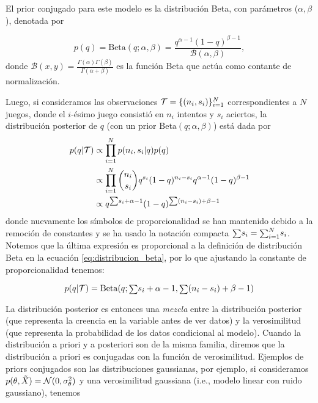 El prior conjugado para este modelo es la distribución Beta, con parámetros ($\alpha, \beta$), denotada por 

\begin{equation}
	p(q) = \text{Beta}(q;\alpha,\beta) = \frac{q^{\alpha-1}(1-q)^{\beta-1}}{\mathcal{B}(\alpha, \beta)},
	\label{eq:distribucion_beta}
\end{equation}
donde $\mathcal{B}(x,y) = \frac{\Gamma(\alpha)\Gamma(\beta)}{\Gamma(\alpha+\beta)}$ es la función Beta que actúa como contante de normalización.


Luego, si consideramos las observaciones ${\mathcal T} = \{(n_i,s_i)\}_{i=1}^N$ correspondientes a $N$ juegos, donde el $i$-ésimo juego consistió en $n_i$ intentos y $s_i$ aciertos, la distribución posterior de $q$ (con un prior $\text{Beta}(q;\alpha,\beta)$) está dada por
\begin{align}
	p(q|{\mathcal T}) & 	\propto \prod_{i=1}^N  p(n_i,s_i|q)p(q)  \\
			 & \propto  \prod_{i=1}^N\binom{n_i}{s_i}q^{s_i}(1-q)^{n_i-s_i}q^{\alpha-1}(1-q)^{\beta-1} \nonumber\\
			 & \propto  q^{{\scriptstyle\sum} s_i + \alpha - 1}(1-q)^{{\scriptstyle\sum} (n_i-s_i) + \beta-1} \nonumber
\end{align}
donde nuevamente los símbolos de proporcionalidad se han mantenido debido a la remoción de constantes y se ha usado la notación compacta ${\scriptstyle\sum} s_i = {\scriptstyle\sum}_{i=1}^N s_i$. Notemos que la última expresión es proporcional a la definición de distribución Beta en la ecuación \eqref{eq:distribucion_beta}, por lo que ajustando la constante de proporcionalidad tenemos: 

\begin{equation}
	p(q|{\mathcal T}) = \text{Beta}(q;{\scriptstyle\sum} s_i + \alpha - 1,{\scriptstyle\sum} (n_i-s_i) + \beta-1)
\end{equation}






La distribución posterior es entonces una \emph{mezcla} entre la distribución posterior (que representa la creencia en la variable antes de ver datos) y la verosimilitud (que representa la probabilidad de los datos condicional al modelo). Cuando la distribución a priori y a posteriori son de la misma familia, diremos que  la distribución a priori es conjugadas con la función de verosimilitud. Ejemplos de priors conjugados son las distribuciones gaussianas, por ejemplo, si consideramos $p(\theta,\tilde{X}) = {\mathcal N}(0,\sigma_\theta^2)$ y una verosimilitud gaussiana (i.e., modelo linear con ruido gaussiano), tenemos

